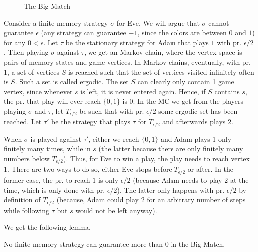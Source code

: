 \begin{figure}

\center
{}
\caption{The Big Match}\label{fig:bm}
\end{figure}

Consider a finite-memory strategy $\sigma$ for Eve. We will argue that $\sigma$ cannot guarantee $\epsilon$ (any strategy can guarantee $-1$, since the colors are between $0$ and $1$) for any $0<\epsilon$. Let $\tau$ be the stationary strategy for Adam that plays $1$ with pr. $\epsilon/2$.
Then playing $\sigma$ against $\tau$, we get an Markov chain, where the vertex space is pairs of memory states and game vertices. 
In Markov chains, eventually, with pr. 1, a set of vertices $S$ is reached such that the set of vertices visited infinitely often is $S$. Such a set is called ergodic.
The set $S$ can clearly only contain 1 game vertex, since whenever $s$ is left, it is never entered again.
Hence, if $S$ contains $s$, the pr. that play will ever reach $\{0,1\}$ is 0.
In the MC we get from the players playing $\sigma$ and $\tau$, let $T_{\epsilon/2}$ be such that with pr. $\epsilon/2$ some ergodic set has been reached. 
Let $\tau'$ be the strategy that plays $\tau$ for $T_{\epsilon/2}$ and afterwards plays $2$. 

When $\sigma$ is played against $\tau'$, either we reach $\{0,1\}$ and Adam plays 1 only finitely many times, while in $s$ (the latter because there are only finitely many numbers below $T_{\epsilon/2}$). Thus, for Eve to win a play, the play needs to reach vertex 1. There are two ways to do so, either Eve stops before $T_{\epsilon/2}$ or after. In the former case, the pr. to reach $1$ is only $\epsilon/2$ (because Adam needs to play $2$ at the time, which is only done with pr. $\epsilon/2$). The latter only happens with pr. $\epsilon/2$ by definition of $T_{\epsilon/2}$ (because, Adam could play $2$ for an arbitrary number of steps while following $\tau$ but $s$ would not be left anyway).

We get the following lemma.

\begin{lemma}\label{lemm:no_finite_meanpayoff}
No finite memory strategy can guarantee more than $0$ in the Big Match.
\end{lemma}

